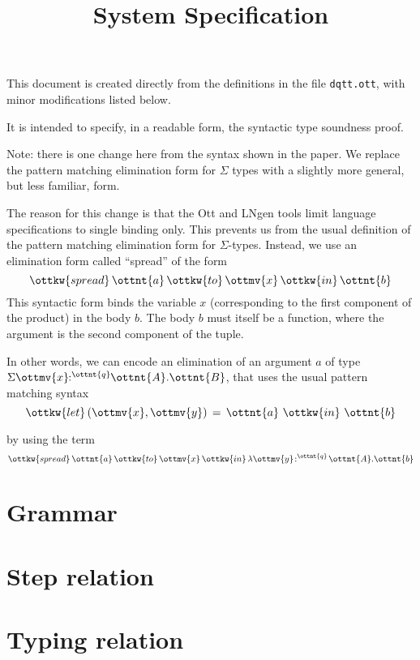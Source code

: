 \documentclass{article}
\title{System Specification}
\begin{document}
\maketitle

This document is created directly from the definitions in the file
{\texttt{dqtt.ott}}, with minor modifications listed below.

It is intended to specify, in a readable form, the syntactic type soundness
proof.

Note: there is one change here from the syntax shown in the paper. We replace
the pattern matching elimination form for $\Sigma$ types with a slightly more
general, but less familiar, form.

The reason for this change is that the Ott and LNgen tools limit language
specifications to single binding only. This prevents us from the usual
definition of the pattern matching elimination form for
$\Sigma$-types. Instead, we use an elimination form called ``spread'' of the
form
\[
 \ottkw{spread}\,  \ottnt{a} \, \ottkw{to}\,  \ottmv{x} \, \ottkw{in}\,  \ottnt{b}
\]
This syntactic form binds the variable $x$ (corresponding to the first
component of the product) in the body $b$. The body $b$ must itself be a
function, where the argument is the second component of the tuple.

In other words, we can encode an elimination of an argument $a$
of type $ \Sigma  \ottmv{x} \!\!:^ \ottnt{q} \!\! \ottnt{A} . \ottnt{B} $, that uses
the usual pattern matching syntax
\[ 
     \ottkw{let}\, (\ottmv{x},\ottmv{y}) \,=\, \ottnt{a} \ \ottkw{in}\  \ottnt{b} 
\] 

by using the term
\[
   \ottkw{spread}\,  \ottnt{a} \, \ottkw{to}\,  \ottmv{x} \, \ottkw{in}\,  \lambda \ottmv{y} \!:^ \ottnt{q} \! \ottnt{A} . \ottnt{b}
\]

\section{Grammar}

\ottgrammartabular{
\ottusage\ottinterrule
\otttm\ottinterrule
\ottcontext\ottinterrule
\ottD\ottafterlastrule
}


\section{Step relation}
\ottdefnsJOp{} 
\section{Typing relation}
\end{document}
